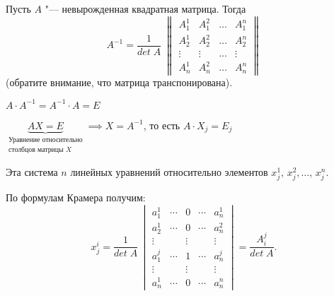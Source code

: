 \begin{theorem}
  Пусть $A$ "--- невырожденная квадратная матрица. Тогда \begin{equation*}
    A^{-1} = \frac{1}{det\;A} \; \begin{Vmatrix}
      A_1^1& A_1^2 & \ldots & A_1^n \\
      A_2^1 & A_2^2 & \ldots & A_2^n \\
      \vdots & \vdots & \ldots & \vdots \\
      A_n^1 & A_n^2 & \ldots & A_n^n
    \end{Vmatrix}
  \end{equation*}
  (обратите внимание, что матрица транспонирована).
\end{theorem}

\begin{Proof}
  $A \cdot A^{-1} = A^{-1} \cdot A = E$

  $\underbrace{AX = E}_{\substack{\text{Уравнение относительно} \\ \text{столбцов матрицы } X}}\implies X = A^{-1}$, то есть $A \cdot X_j = E_j$

  Эта система $n$ линейных уравнений относительно элементов $x_j^1, \, x_j^2, \ldots,\, x_j^n$.

  По формулам Крамера получим:
  \begin{equation*}
    x_j^i = \frac{1}{det\;A}\, \begin{vmatrix}
      a_1^1 & \cdots & 0 & \cdots & a_n^1 \\
      a_2^1 & \cdots & 0 & \cdots & a_n^2 \\
      \vdots && \vdots && \vdots \\
      a_1^j & \cdots & 1 & \cdots & a_n^j \\
      \vdots && \vdots && \vdots \\
      a_n^1 & \cdots & 0 & \cdots & a_n^n
    \end{vmatrix} = \frac{A_i^j}{det\;A}.
  \end{equation*}
\end{Proof}

